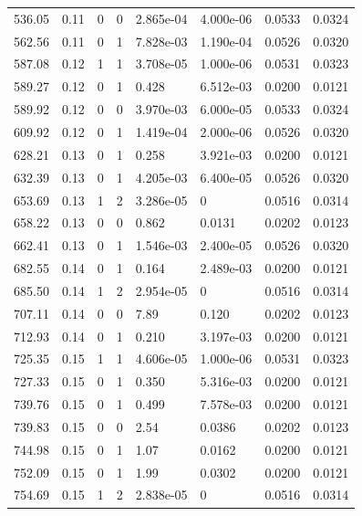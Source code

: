 \documentclass[preview]{standalone}
\begin{document}
{{{\begin{tabular}{L{1.2cm}C{1.2cm} C{0.3cm}C{0.5cm} C{1.4cm}C{1.4cm} C{1.4cm}C{1.4cm}}
  536.05  &  0.11  & 0     &  0 &  2.865e-04  & 4.000e-06  & 0.0533 &  0.0324   \\ 
  562.56  &  0.11  & 0     &  1 &  7.828e-03  & 1.190e-04  & 0.0526 &  0.0320   \\ 
  587.08  &  0.12  & 1     &  1 &  3.708e-05  & 1.000e-06  & 0.0531 &  0.0323   \\ 
  589.27  &  0.12  & 0     &  1 &  0.428  & 6.512e-03  & 0.0200 &  0.0121   \\ 
  589.92  &  0.12  & 0     &  0 &  3.970e-03  & 6.000e-05  & 0.0533 &  0.0324   \\ 
  609.92  &  0.12  & 0     &  1 &  1.419e-04  & 2.000e-06  & 0.0526 &  0.0320   \\ 
  628.21  &  0.13  & 0     &  1 &  0.258  & 3.921e-03  & 0.0200 &  0.0121   \\ 
  632.39  &  0.13  & 0     &  1 &  4.205e-03  & 6.400e-05  & 0.0526 &  0.0320   \\ 
  653.69  &  0.13  & 1     &  2 &  3.286e-05  & 0  & 0.0516 &  0.0314   \\ 
  658.22  &  0.13  & 0     &  0 &  0.862  & 0.0131  & 0.0202 &  0.0123   \\ 
  662.41  &  0.13  & 0     &  1 &  1.546e-03  & 2.400e-05  & 0.0526 &  0.0320   \\ 
  682.55  &  0.14  & 0     &  1 &  0.164  & 2.489e-03  & 0.0200 &  0.0121   \\ 
  685.50  &  0.14  & 1     &  2 &  2.954e-05  & 0  & 0.0516 &  0.0314   \\ 
  707.11  &  0.14  & 0     &  0 &  7.89  & 0.120  & 0.0202 &  0.0123   \\ 
  712.93  &  0.14  & 0     &  1 &  0.210  & 3.197e-03  & 0.0200 &  0.0121   \\ 
  725.35  &  0.15  & 1     &  1 &  4.606e-05  & 1.000e-06  & 0.0531 &  0.0323   \\ 
  727.33  &  0.15  & 0     &  1 &  0.350  & 5.316e-03  & 0.0200 &  0.0121   \\ 
  739.76  &  0.15  & 0     &  1 &  0.499  & 7.578e-03  & 0.0200 &  0.0121   \\ 
  739.83  &  0.15  & 0     &  0 &  2.54  & 0.0386  & 0.0202 &  0.0123   \\ 
  744.98  &  0.15  & 0     &  1 &  1.07  & 0.0162  & 0.0200 &  0.0121   \\ 
  752.09  &  0.15  & 0     &  1 &  1.99  & 0.0302  & 0.0200 &  0.0121   \\ 
  754.69  &  0.15  & 1     &  2 &  2.838e-05  & 0  & 0.0516 &  0.0314   \\ 

\end{tabular}}}}
\end{document}
